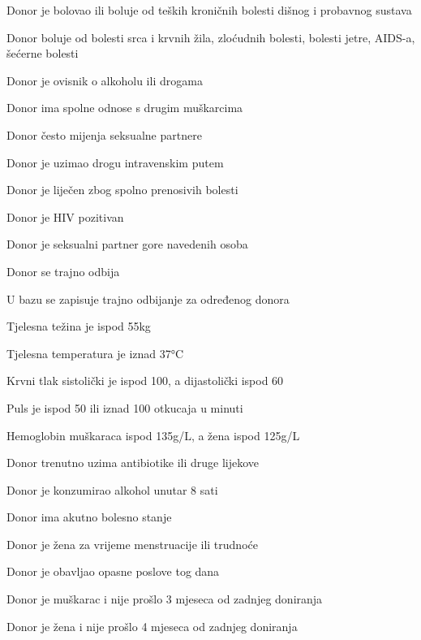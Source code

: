 \begin{packed_item}
\begin{packed_item}
\begin{packed_enum}
		\end{packed_enum}
		
		\item[6.a] {\item[]\begin{packed_item}
		\item[•]Donor je bolovao ili boluje od teških kroničnih bolesti dišnog i probavnog sustava
		\item[•]Donor boluje od bolesti srca i krvnih žila, zloćudnih bolesti, bolesti jetre, AIDS-a, šećerne bolesti 
		\item[•]Donor je ovisnik o alkoholu ili drogama 
		\item[•]Donor ima spolne odnose s drugim muškarcima 
		\item[•]Donor često mijenja seksualne partnere
		\item[•]Donor je uzimao drogu intravenskim putem
		\item[•]Donor je liječen zbog spolno prenosivih bolesti 
		\item[•]Donor je HIV pozitivan
		\item[•]Donor je seksualni partner gore navedenih osoba
		\end{packed_item}}
		\item[] \begin{packed_enum}
			
			\item Donor se trajno odbija
			\item U bazu se zapisuje trajno odbijanje za određenog donora
		\end{packed_enum}
\eject
		\item[6.b] {\item[]\begin{packed_item}
		\item[•]Tjelesna težina je ispod 55kg
		\item[•]Tjelesna temperatura je iznad 37°C 
		\item[•]Krvni tlak sistolički je ispod 100, a dijastolički ispod 60 
		\item[•]Puls je ispod 50 ili iznad 100 otkucaja u minuti 
		\item[•]Hemoglobin muškaraca ispod 135g/L, a žena ispod 125g/L
		\item[•]Donor trenutno uzima antibiotike ili druge lijekove      
		\item[•]Donor je konzumirao alkohol unutar 8 sati 
		\item[•]Donor ima akutno bolesno stanje
		\item[•]Donor je žena za vrijeme menstruacije ili trudnoće 
	    \item[•]Donor je obavljao opasne poslove tog dana
	    \item[•]Donor je muškarac i nije prošlo 3 mjeseca od zadnjeg doniranja
	    \item[•]Donor je žena i nije prošlo 4 mjeseca od zadnjeg doniranja\end{packed_item}}
		\item[] \begin{packed_enum}
			

\end{packed_enum}
\end{packed_item}
\end{packed_item}
